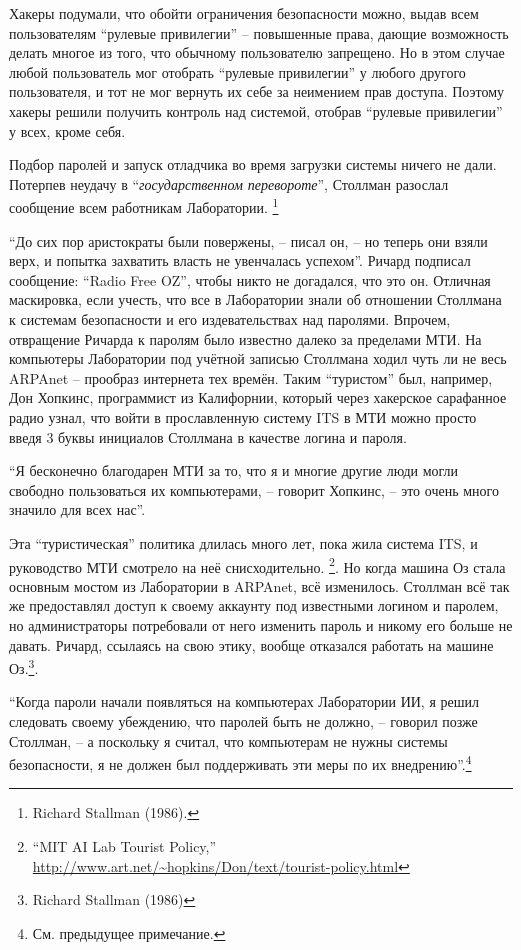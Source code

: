 Хакеры подумали, что обойти ограничения безопасности можно, выдав всем пользователям \enquote{рулевые привилегии} -- повышенные права, дающие возможность делать многое из того, что обычному пользователю запрещено. Но в этом случае любой пользователь мог отобрать \enquote{рулевые привилегии} у любого другого пользователя, и тот не мог вернуть их себе за неимением прав доступа. Поэтому хакеры решили получить контроль над системой, отобрав \enquote{рулевые привилегии} у всех, кроме себя.

Подбор паролей и запуск отладчика во время загрузки системы ничего не дали. Потерпев неудачу в \enquote{\textit{государственном перевороте}}, Столлман разослал сообщение всем работникам Лаборатории. \footnote{Richard Stallman (1986).}

\enquote{До сих пор аристократы были повержены, -- писал он, -- но теперь они взяли верх, и попытка захватить власть не увенчалась успехом}. Ричард подписал сообщение: \enquote{Radio Free OZ}, чтобы никто не догадался, что это он. Отличная маскировка, если учесть, что все в Лаборатории знали об отношении Столлмана к системам безопасности и его издевательствах над паролями. Впрочем, отвращение Ричарда к паролям было известно далеко за пределами МТИ. На компьютеры Лаборатории под учётной записью Столлмана ходил чуть ли не весь ARPAnet -- прообраз интернета тех времён. Таким \enquote{туристом} был, например, Дон Хопкинс, программист из Калифорнии, который через хакерское сарафанное радио узнал, что войти в прославленную систему ITS в МТИ можно просто введя 3 буквы инициалов Столлмана в качестве логина и пароля.

\enquote{Я бесконечно благодарен МТИ за то, что я и многие другие люди могли свободно пользоваться их компьютерами, -- говорит Хопкинс, -- это очень много значило для всех нас}.

Эта \enquote{туристическая} политика длилась много лет, пока жила система ITS, и руководство МТИ смотрело на неё снисходительно. \footnote{\enquote{MIT AI Lab Tourist Policy,} \url{http://www.art.net/~hopkins/Don/text/tourist-policy.html}}. Но когда машина Оз стала основным мостом из Лаборатории в ARPAnet, всё изменилось. Столлман всё так же предоставлял доступ к своему аккаунту под известными логином и паролем, но администраторы потребовали от него изменить пароль и никому его больше не давать. Ричард, ссылаясь на свою этику, вообще отказался работать на машине Оз.\footnote{Richard Stallman (1986)}.

\enquote{Когда пароли начали появляться на компьютерах Лаборатории ИИ, я решил следовать своему убеждению, что паролей быть не должно, -- говорил позже Столлман, -- а поскольку я считал, что компьютерам не нужны системы безопасности, я не должен был поддерживать эти меры по их внедрению}.\footnote{См. предыдущее примечание.}

